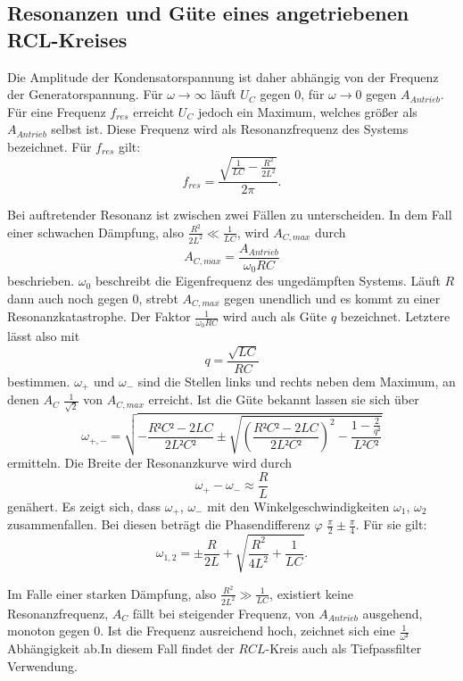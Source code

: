 \subsection{Resonanzen und Güte eines angetriebenen RCL-Kreises}

Die Amplitude der Kondensatorspannung ist daher abhängig von der Frequenz der Generatorspannung.
Für $\omega \to \infty$ läuft $U_C$ gegen 0, für $\omega \to 0$ gegen $A_{Antrieb}$.
Für eine Frequenz $f_{res}$ erreicht $U_C$  jedoch ein Maximum, welches größer als $A_{Antrieb}$ selbst ist.
Diese Frequenz wird als Resonanzfrequenz des Systems bezeichnet. Für $f_{res}$ gilt:
\begin{equation}
  f_{res} = \frac{\sqrt{\frac{1}{LC}-\frac{R^2}{2L^2}}}{2 \pi}\text{.}
\end{equation}

Bei auftretender Resonanz ist zwischen zwei Fällen zu unterscheiden.
In dem Fall einer schwachen Dämpfung, also $\frac{R^2}{2L^2} \ll \frac{1}{LC}$, wird  $A_{C,max}$ durch
\begin{equation}
  A_{C,max} = \frac{A_{Antrieb}}{\omega_0 RC}
\end{equation}
beschrieben. $\omega_0$ beschreibt die Eigenfrequenz des ungedämpften Systems.
Läuft $R$ dann auch noch gegen 0, strebt $A_{C,max}$ gegen unendlich und es kommt zu einer
Resonanzkatastrophe.
 Der Faktor $\frac{1}{\omega_0 RC}$ wird auch als Güte $q$ bezeichnet.
Letztere lässt also mit
\begin{equation}
  q = \frac{\sqrt{LC}}{RC}
  \end{equation}
bestimmen. $\omega_+$ und $\omega_-$ sind die Stellen links und rechts neben dem Maximum,
 an denen $A_C$ $\frac{1}{\sqrt{2}}$ von $A_{C,max}$ erreicht.
 Ist die Güte bekannt lassen sie sich über
 \begin{equation}
   \omega_{+,-} = \sqrt{-\frac{R²C²-2LC}{2L²C²} \pm \sqrt{\left( \frac{R²C²-2LC}{2L²C²} \right) ^2 - \frac{1- \frac{2}{q²}}{L²C²}}}
 \end{equation}
 ermitteln.
 Die Breite der Resonanzkurve wird durch 
 \begin{equation}
   \omega_+ - \omega_- \approx \frac{R}{L}
 \end{equation}
 genähert. Es zeigt sich, dass $\omega_+$, $\omega_-$ mit den Winkelgeschwindigkeiten $\omega_1$, $\omega_2$ zusammenfallen.
  Bei diesen beträgt die Phasendifferenz $\varphi$ $\frac{\pi}{2}\pm \frac{\pi}{4}$. Für sie gilt:
\begin{equation}
  \omega_{1,2} = \pm \frac{R}{2L} + \sqrt{\frac{R^2}{4L^2} + \frac{1}{LC}}\text{.}
\end{equation}

 Im Falle einer starken Dämpfung, also $\frac{R^2}{2L^2} \gg \frac{1}{LC}$, existiert keine Resonanzfrequenz, $A_C$ fällt bei steigender Frequenz, von $A_{Antrieb}$ ausgehend, monoton gegen 0. Ist die Frequenz ausreichend hoch, zeichnet
  sich eine $\frac{1}{\omega²}$ Abhängigkeit ab.In diesem Fall findet der $RCL$-Kreis auch als Tiefpassfilter Verwendung.
